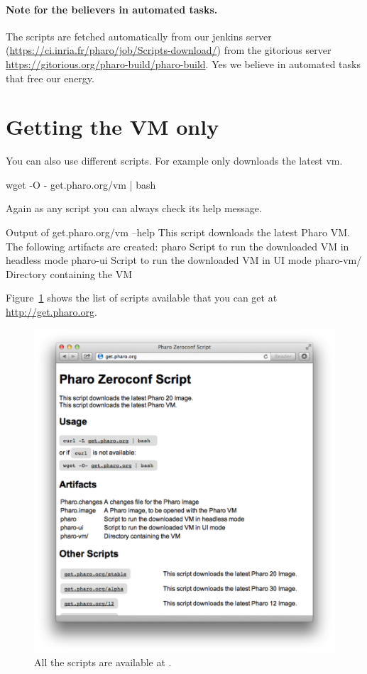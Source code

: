 \documentclass[a4paper,10pt,twoside]{book}
\begin{document}
\paragraph{Note for the believers in automated tasks.} 
The scripts are fetched automatically from our jenkins server (\url{https://ci.inria.fr/pharo/job/Scripts-download/}) from the gitorious server \url{https://gitorious.org/pharo-build/pharo-build}.
Yes we believe in automated tasks that free our energy. 

\section{Getting the VM only}
You can also use different scripts. For example  only downloads the latest vm.

\begin{code}{}
wget -O - get.pharo.org/vm | bash
\end{code}


Again as any script you can always check its help message.

\begin{code}[]{Output of get.pharo.org/vm --help}
This script downloads the latest Pharo VM.
The following artifacts are created:
    pharo      Script to run the downloaded VM in headless mode
    pharo-ui   Script to run the downloaded VM in UI mode
    pharo-vm/  Directory containing the VM
\end{code}


Figure~\ref{fig:website} shows the list of scripts available that you can get at \url{http://get.pharo.org}.

\begin{figure}[!h]
	\centering
	\includegraphics[width=\textwidth]{zeroconfwebsite}
	\caption{All the scripts are available at .\label{fig:website}}
\end{figure}
\end{document}
